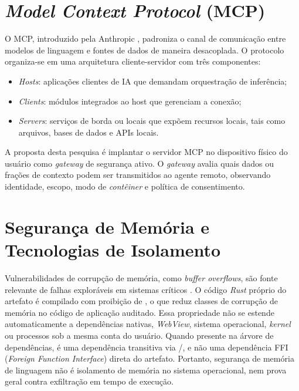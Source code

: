 \section{\textit{Model Context Protocol} (MCP)}
O MCP, introduzido pela Anthropic \cite{anthropic2024}, padroniza o canal de comunicação entre modelos de linguagem e fontes de dados de maneira desacoplada. O protocolo organiza-se em uma arquitetura cliente-servidor com três componentes:
\begin{itemize}
\item \textit{Hosts}: aplicações clientes de IA que demandam orquestração de inferência;
\item \textit{Clients}: módulos integrados ao host que gerenciam a conexão;
\item \textit{Servers}: serviços de borda ou locais que expõem recursos locais, tais como arquivos, bases de dados e APIs locais.
\end{itemize}
A proposta desta pesquisa é implantar o servidor MCP no dispositivo físico do usuário como \textit{gateway} de segurança ativo. O \textit{gateway} avalia quais dados ou frações de contexto podem ser transmitidos ao agente remoto, observando identidade, escopo, modo de \textit{contêiner} e política de consentimento.

\section{Segurança de Memória e Tecnologias de Isolamento}
Vulnerabilidades de corrupção de memória, como \textit{buffer overflows}, são fonte relevante de falhas exploráveis em sistemas críticos \cite{nsa2022}. O código \textit{Rust} próprio do artefato é compilado com proibição de , o que reduz classes de corrupção de memória no código de aplicação auditado. Essa propriedade não se estende automaticamente a dependências nativas, \textit{WebView}, sistema operacional, \textit{kernel} ou processos sob a mesma conta do usuário. Quando presente na árvore de dependências,  é uma dependência transitiva via /, e não uma dependência FFI (\textit{Foreign Function Interface}) direta do artefato. Portanto, segurança de memória de linguagem não é isolamento de memória no sistema operacional, nem prova geral contra exfiltração em tempo de execução.

